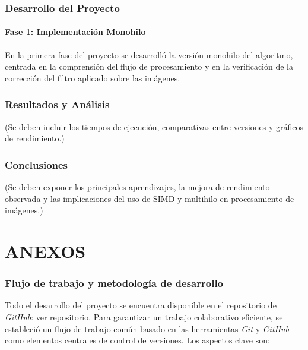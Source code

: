 \documentclass[11pt,a4paper]{article}
\begin{document}
\section{Desarrollo del Proyecto}
\subsection{Fase 1: Implementación Monohilo}
En la primera fase del proyecto se desarrolló la versión monohilo del algoritmo, centrada en la comprensión del flujo de procesamiento y en la verificación de la corrección del filtro aplicado sobre las imágenes.

\section{Resultados y Análisis}
(Se deben incluir los tiempos de ejecución, comparativas entre versiones y gráficos de rendimiento.)

\section{Conclusiones}
(Se deben exponer los principales aprendizajes, la mejora de rendimiento observada y las implicaciones del uso de SIMD y multihilo en procesamiento de imágenes.)

\newpage
\part*{ANEXOS}
\appendix
\renewcommand{\thesection}{\Alph{section}}

\section{Flujo de trabajo y metodología de desarrollo}
Todo el desarrollo del proyecto se encuentra disponible en el repositorio de \textit{GitHub}: \href{https://www.github.com/Mendana/teamwork-ac-2025}{ver repositorio}. Para garantizar un trabajo colaborativo eficiente, se estableció un flujo de trabajo común basado en las herramientas \textit{Git} y \textit{GitHub} como elementos centrales de control de versiones. Los aspectos clave son:
\end{document}
